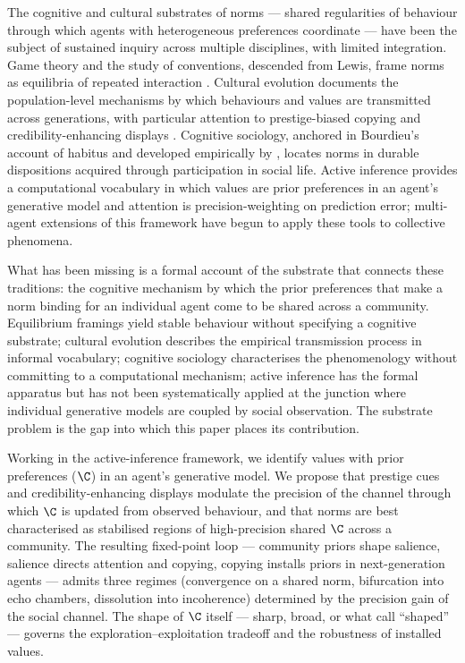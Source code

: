 \documentclass[11pt,a4paper]{article}
\begin{document}
The cognitive and cultural substrates of norms --- shared regularities of
behaviour through which agents with heterogeneous preferences coordinate
---  have been the subject of sustained inquiry across multiple disciplines,
with limited integration. Game theory and the study of conventions, descended
from Lewis, frame norms as equilibria of repeated interaction
\citep{koster2022SillyRules,oldenburgZhiXuan2024BayesianRule,
vinitsky2023sanctions}. Cultural evolution
\citep{henrichGilWhite2001Prestige,heyes2018CognitiveGadgets} documents the
population-level mechanisms by which behaviours and values are transmitted
across generations, with particular attention to prestige-biased copying and
credibility-enhancing displays \citep{henrich2009CREDs,chudek2012BystanderGaze}.
Cognitive sociology, anchored in Bourdieu's account of habitus and developed
empirically by \citet{vaisey2009DualProcess}, locates norms in durable
dispositions acquired through participation in social life. Active inference
\citep{friston2015ActiveInferenceEpistemic,parrFriston2017Attention} provides
a computational vocabulary in which values are prior preferences in an
agent's generative model and attention is precision-weighting on prediction
error; multi-agent extensions of this framework
\citep{albarracin2022EpistemicCommunities,heins2024CollectiveSurprise} have
begun to apply these tools to collective phenomena.

What has been missing is a formal account of the substrate that connects
these traditions: the cognitive mechanism by which the prior preferences
that make a norm binding for an individual agent come to be shared across a
community. Equilibrium framings yield stable behaviour without specifying a
cognitive substrate; cultural evolution describes the empirical transmission
process in informal vocabulary; cognitive sociology characterises the
phenomenology without committing to a computational mechanism; active
inference has the formal apparatus but has not been systematically applied
at the junction where individual generative models are coupled by social
observation. The substrate problem is the gap into which this paper places
its contribution.

Working in the active-inference framework, we identify values with prior
preferences ($\C$) in an agent's generative model. We propose that prestige
cues and credibility-enhancing displays modulate the precision of the
channel through which $\C$ is updated from observed behaviour, and that
norms are best characterised as stabilised regions of high-precision shared
$\C$ across a community. The resulting fixed-point loop --- community priors
shape salience, salience directs attention and copying, copying installs
priors in next-generation agents --- admits three regimes (convergence on a
shared norm, bifurcation into echo chambers, dissolution into incoherence)
determined by the precision gain of the social channel. The shape of $\C$
itself --- sharp, broad, or what \citet{torresan2025ShapeC} call ``shaped''
--- governs the exploration--exploitation tradeoff and the robustness of
installed values.
\end{document}
